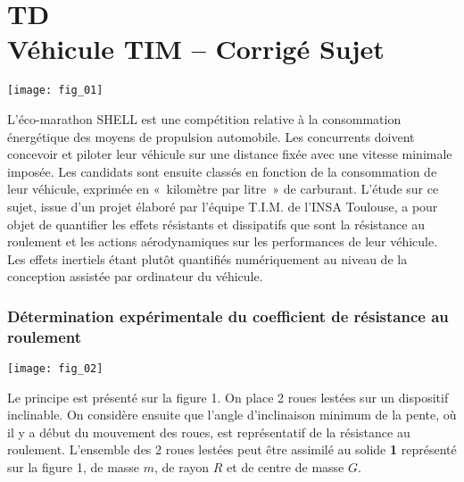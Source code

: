 \chapter*{TD  \\ 
Véhicule TIM -- \ifprof Corrigé \else Sujet \fi}


\iflivret {} \else
\ifprof  {} \else \fi
\fi
\setcounter{question}{0}


\begin{marginfigure}
\texttt{[image: fig\_01]}
\end{marginfigure}


\ifprof
\else
L’éco-marathon SHELL est une compétition relative à la consommation énergétique des moyens de propulsion automobile. Les concurrents doivent concevoir et piloter leur véhicule sur une distance fixée avec une vitesse minimale imposée.  Les candidats sont ensuite classés en fonction de la consommation de leur véhicule, exprimée en «~kilomètre par litre~» de carburant. L’étude sur ce sujet, issue d’un projet élaboré par l’équipe T.I.M. de l’INSA Toulouse, a pour objet de quantifier les effets résistants et dissipatifs que sont la résistance au roulement et les actions aérodynamiques sur les performances de leur véhicule. Les effets inertiels étant plutôt quantifiés numériquement au niveau de la conception assistée par ordinateur du véhicule. 
\fi

\subsection*{Détermination expérimentale du coefficient de résistance au roulement}

\ifprof
\else


\begin{marginfigure}
\texttt{[image: fig\_02]}
\end{marginfigure}

Le principe est présenté sur la figure 1. On place 2 roues lestées sur un dispositif inclinable. On considère ensuite que l’angle d’inclinaison minimum de la pente, où il y a début du mouvement des roues, est représentatif de la résistance au roulement.  
L’ensemble des 2 roues lestées peut être assimilé au solide \textbf{1} représenté sur la figure 1, de masse $m$, de rayon $R$ et de centre de masse $G$. 

